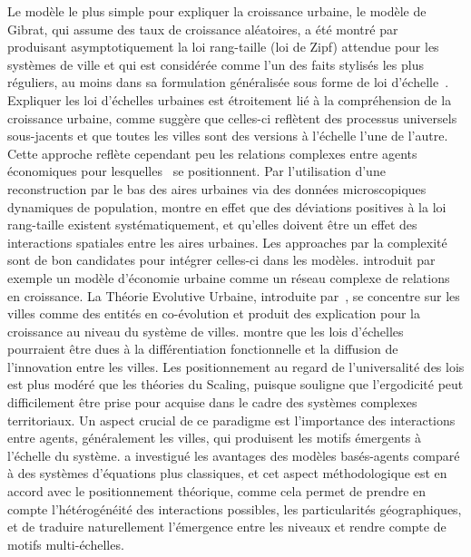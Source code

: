 {Le modèle le plus simple pour expliquer la croissance urbaine, le modèle de Gibrat, qui assume des taux de croissance aléatoires, a été montré par~\cite{gabaix1999zipf} produisant asymptotiquement la loi rang-taille (loi de Zipf) attendue pour les systèmes de ville et qui est considérée comme l'un des faits stylisés les plus réguliers, au moins dans sa formulation généralisée sous forme de loi d'échelle~\cite{nitsch2005zipf}. Expliquer les loi d'échelles urbaines est étroitement lié à la compréhension de la croissance urbaine, comme \cite{bettencourt2008large} suggère que celles-ci reflètent des processus universels sous-jacents et que toutes les villes sont des versions à l'échelle l'une de l'autre. Cette approche reflète cependant peu les relations complexes entre agents économiques pour lesquelles~\cite{storper2009rethinking} se positionnent. Par l'utilisation d'une reconstruction par le bas des aires urbaines via des données microscopiques dynamiques de population, \cite{rozenfeld2008laws} montre en effet que des déviations positives à la loi rang-taille existent systématiquement, et qu'elles doivent être un effet des interactions spatiales entre les aires urbaines. Les approaches par la complexité sont de bon candidates pour intégrer celles-ci dans les modèles. \cite{andersson2006complex} introduit par exemple un modèle d'économie urbaine comme un réseau complexe de relations en croissance. La Théorie Evolutive Urbaine, introduite par~\cite{pumain1997pour}, se concentre sur les villes comme des entités en co-évolution et produit des explication pour la croissance au niveau du système de villes. \cite{pumain2006evolutionary} montre que les lois d'échelles pourraient être dues à la différentiation fonctionnelle et la diffusion de l'innovation entre les villes. Les positionnement au regard de l'universalité des lois est plus modéré que les théories du Scaling, puisque \cite{pumain2012urban} souligne que l'ergodicité peut difficilement être prise pour acquise dans le cadre des systèmes complexes territoriaux. Un aspect crucial de ce paradigme est l'importance des interactions entre agents, généralement les villes, qui produisent les motifs émergents à l'échelle du système. \cite{pumain2013theoretical} a investigué les avantages des modèles basés-agents comparé à des systèmes d'équations plus classiques, et cet aspect méthodologique est en accord avec le positionnement théorique, comme cela permet de prendre en compte l'hétérogénéité des interactions possibles, les particularités géographiques, et de traduire naturellement l'émergence entre les niveaux et rendre compte de motifs multi-échelles.
}


